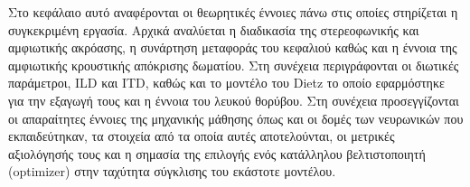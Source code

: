 
\noindent 
Στο κεφάλαιο αυτό αναφέρονται οι θεωρητικές έννοιες πάνω στις οποίες στηρίζεται η συγκεκριμένη εργασία. Αρχικά αναλύεται η διαδικασία της στερεοφωνικής και αμφιωτικής ακρόασης, η συνάρτηση μεταφοράς του κεφαλιού καθώς και η έννοια της αμφιωτικής κρουστικής απόκρισης δωματίου. Στη συνέχεια περιγράφονται οι διωτικές παράμετροι, ILD και ITD, καθώς και το μοντέλο του Dietz \cite{Dietz2011} το οποίο εφαρμόστηκε για την εξαγωγή τους και η έννοια του λευκού θορύβου. Στη συνέχεια προσεγγίζονται οι απαραίτητες έννοιες της μηχανικής μάθησης όπως και οι δομές των νευρωνικών που εκπαιδεύτηκαν, τα στοιχεία από τα οποία αυτές αποτελούνται, οι μετρικές αξιολόγησής τους και η σημασία της επιλογής ενός κατάλληλου βελτιστοποιητή (optimizer) στην ταχύτητα σύγκλισης του εκάστοτε μοντέλου.














